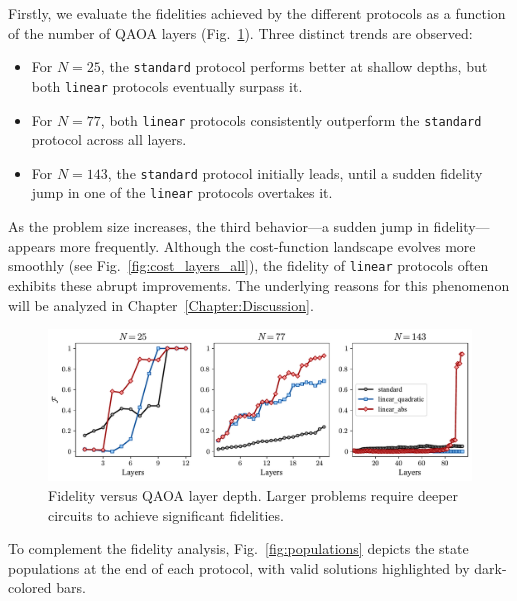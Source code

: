 Firstly, we evaluate the fidelities achieved by the different protocols as a function of the number of QAOA layers (Fig.~\ref{fig:fidelity_layers}). Three distinct trends are observed:  
\begin{itemize}
    \item For $N = 25$, the \texttt{standard} protocol performs better at shallow depths, but both \texttt{linear} protocols eventually surpass it.  
    \item For $N = 77$, both \texttt{linear} protocols consistently outperform the \texttt{standard} protocol across all layers.  
    \item For $N = 143$, the \texttt{standard} protocol initially leads, until a sudden fidelity jump in one of the \texttt{linear} protocols overtakes it.  
\end{itemize}

As the problem size increases, the third behavior---a sudden jump in fidelity---appears more frequently. Although the cost-function landscape evolves more smoothly (see Fig.~\ref{fig:cost_layers_all}), the fidelity of \texttt{linear} protocols often exhibits these abrupt improvements. The underlying reasons for this phenomenon will be analyzed in Chapter~\ref{Chapter:Discussion}.

\begin{figure}[h]
    \centering
    \includegraphics[width=1\textwidth]{04-results/figs/fidelity_layers_2577143.pdf}
    \caption{Fidelity versus QAOA layer depth. Larger problems require deeper circuits to achieve significant fidelities.}
    \label{fig:fidelity_layers}
\end{figure}

To complement the fidelity analysis, Fig.~\ref{fig:populations} depicts the state populations at the end of each protocol, with valid solutions highlighted by dark-colored bars.

